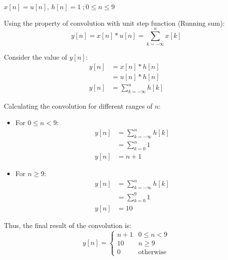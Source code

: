 \documentclass[a4paper, 10pt]{article}
\begin{document}
\newpage

\begin{subproblems}[start=2]
    \item \( x[n] = u[n],\, h[n] = 1 \; ; 0 \leq n \leq 9 \)
\end{subproblems}

\begin{solution}
Using the property of convolution with unit step function (Running sum):
\[ y[n] = x[n] * u[n] = \sum_{k=-\infty}^{n} x[k] \]

Consider the value of \( y[n] \):
\begin{align*}
    y[n] &= x[n] * h[n] \\
    &= u[n] * h[n] \\
    y[n] &= \sum_{k=-\infty}^{n} h[k]
\end{align*}

Calculating the convolution for different ranges of \( n \):
\begin{itemize}
    \item For \( 0 \leq n < 9 \):
    \begin{align*}
        y[n] &= \sum_{k=-\infty}^{n} h[k] \\
        &= \sum_{k=0}^{n} 1 \\
        y[n] &= n + 1
    \end{align*}
    \item For \( n \geq 9 \):
    \begin{align*}
        y[n] &= \sum_{k=-\infty}^{n} h[k] \\
        &= \sum_{k=0}^{9} 1 \\
        y[n] &= 10
    \end{align*}
\end{itemize}

Thus, the final result of the convolution is:
\[ \boxed{
y[n] = \begin{cases}
n + 1 & 0 \leq n < 9 \\
10 & n \geq 9 \\
0 & \text{otherwise}
\end{cases}
} \]
\end{solution}

\newpage
\end{document}
